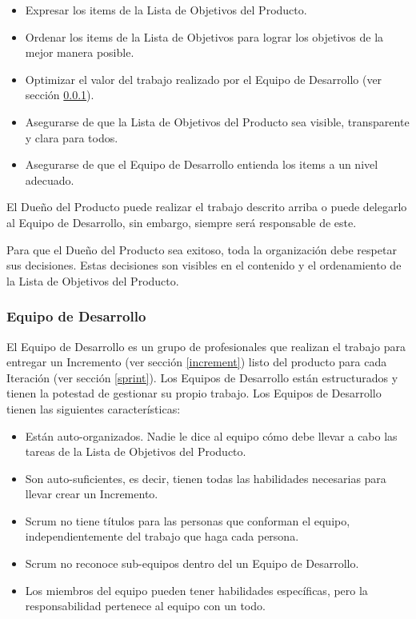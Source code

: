 \begin{itemize}
    \item Expresar los items de la Lista de Objetivos del Producto.
    \item Ordenar los items de la Lista de Objetivos para lograr los objetivos de la mejor manera posible.
    \item Optimizar el valor del trabajo realizado por el Equipo de Desarrollo (ver sección \ref{developmentTeam}).
    \item Asegurarse de que la Lista de Objetivos del Producto sea visible, transparente y clara para todos.
    \item Asegurarse de que el Equipo de Desarrollo entienda los items a un nivel adecuado.
\end{itemize}

El Dueño del Producto puede realizar el trabajo descrito arriba o puede delegarlo al Equipo de Desarrollo, sin embargo, siempre será responsable de este.

Para que el Dueño del Producto sea exitoso, toda la organización debe respetar sus decisiones. Estas decisiones son visibles en el contenido y el ordenamiento de la Lista de Objetivos del Producto. \cite{scrumSchwaber}

\subsubsection{Equipo de Desarrollo} \label{developmentTeam}
El Equipo de Desarrollo es un grupo de profesionales que realizan el trabajo para entregar un Incremento (ver sección \ref{increment}) listo del producto para cada Iteración (ver sección \ref{sprint}). Los Equipos de Desarrollo están estructurados y tienen la potestad de gestionar su propio trabajo. Los Equipos de Desarrollo tienen las siguientes características:

\begin{itemize}
    \item Están auto-organizados. Nadie le dice al equipo cómo debe llevar a cabo las tareas de la Lista de Objetivos del Producto.
    \item Son auto-suficientes, es decir, tienen todas las habilidades necesarias para llevar crear un Incremento.
    \item Scrum no tiene títulos para las personas que conforman el equipo, independientemente del trabajo que haga cada persona.
    \item Scrum no reconoce sub-equipos dentro del un Equipo de Desarrollo.
    \item Los miembros del equipo pueden tener habilidades específicas, pero la responsabilidad pertenece al equipo con un todo. \cite{scrumSchwaber}
\end{itemize}

